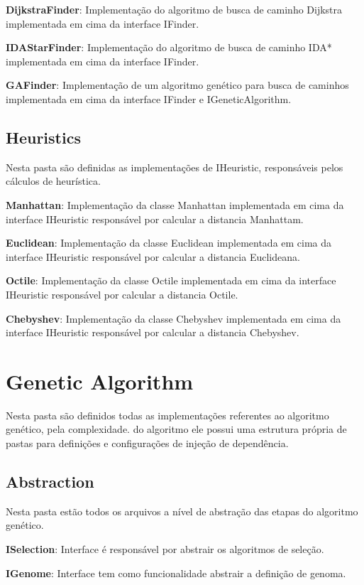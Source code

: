\textbf{DijkstraFinder}: Implementação do algoritmo de busca de caminho Dijkstra implementada em cima da interface IFinder.

\textbf{IDAStarFinder}: Implementação do algoritmo de busca de caminho IDA* implementada em cima da interface IFinder.

\textbf{GAFinder}: Implementação de um algoritmo genético para busca de caminhos implementada em cima da interface IFinder e IGeneticAlgorithm.

\subsection{Heuristics}

Nesta pasta são definidas as implementações de IHeuristic, responsáveis pelos cálculos de heurística.

\textbf{Manhattan}: Implementação da classe Manhattan implementada em cima da interface IHeuristic responsável por calcular a distancia Manhattam.

\textbf{Euclidean}: Implementação da classe Euclidean implementada em cima da interface IHeuristic responsável por calcular a distancia Euclideana.

\textbf{Octile}: Implementação da classe Octile implementada em cima da interface IHeuristic responsável por calcular a distancia Octile.

\textbf{Chebyshev}: Implementação da classe Chebyshev implementada em cima da interface IHeuristic responsável por calcular a distancia Chebyshev.

\section{Genetic Algorithm}

Nesta pasta são definidos todas as implementações referentes ao algoritmo genético, pela complexidade.
do algoritmo ele possui uma estrutura própria de pastas para definições e configurações de injeção de dependência.

\subsection{Abstraction}

Nesta pasta estão todos os arquivos a nível de abstração das etapas do algoritmo genético.

\textbf{ISelection}: Interface é responsável por abstrair os algoritmos de seleção.

\textbf{IGenome}: Interface tem como funcionalidade abstrair a definição de genoma.

